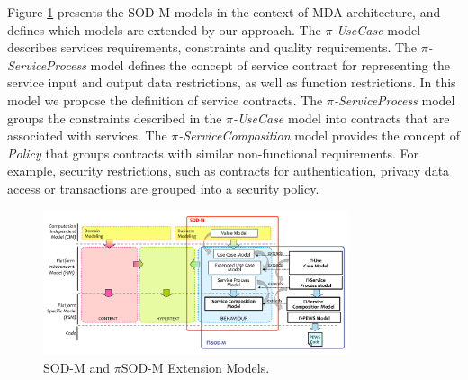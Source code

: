 




 Figure \ref{fig:sodmExtensions} presents the SOD-M models in the context of MDA
 architecture, and defines which models are extended by our approach. The
 \textit{$\pi$-UseCase} model describes services requirements, constraints and quality requirements. The \textit{$\pi$-ServiceProcess} model defines the
concept of service contract for representing the service input and output data restrictions, as well as
function restrictions. In this model we propose the definition of service
contracts. The \textit{$\pi$-ServiceProcess} model groups the constraints
described in the \textit{$\pi$-UseCase} model into contracts that are associated
with services. The  \textit{$\pi$-ServiceComposition} model provides the concept of \textit{Policy}
 that groups contracts with similar non-functional requirements. For
example, security restrictions, such as contracts for authentication, privacy
data access or transactions are grouped into a security policy.



% 
%  

\begin{figure}[ht]
\centering
\includegraphics[width=0.8\textwidth]{chapters/methodology/figs/ArquiteturaPiSOD-M}
\caption{SOD-M and $\pi$SOD-M Extension Models.}
\label{fig:sodmExtensions}
\end{figure}

